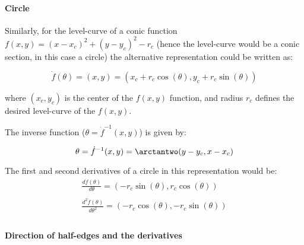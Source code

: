 \paragraph{Circle}
Similarly, for the level-curve of a conic function $f(x,y)=(x-x_c)^2+(y-y_c)^2-r_c$ (hence the level-curve would be a conic section, in this case a circle) the alternative representation could be written as:

\[
\dot{f}(\theta) = (x,y) = \left( x_c + r_c \cos(\theta), y_c + r_c \sin(\theta) \right)
\]

where $(x_c,y_c)$ is the center of the $f(x,y)$ function, and radius $r_c$ defines the desired level-curve of the $f(x,y)$.\bigskip

The inverse function ($\theta = \dot{f}^{-1}(x,y)$) is given by:

\[
\theta = \dot{f}^{-1}(x,y) = \arctantwo (y - y_c, x - x_c)
\]

The first and second derivatives of a circle in this representation would be:
\[
\begin{array}{l}
  \frac{d\dot{f}(\theta)}{d\theta} = \left( -r_c \sin(\theta), r_c \cos(\theta) \right)\\
  \quad\\
  \frac{d^2\dot{f}(\theta)}{d\theta^2} = \left( -r_c \cos(\theta), -r_c \sin(\theta) \right)\\
\end{array}
\]

\paragraph{Direction of half-edges and the derivatives}
